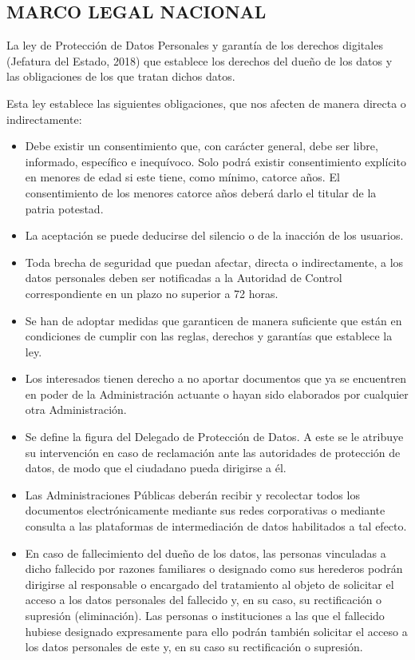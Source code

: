 \documentclass[11pt,a4paper,spanish]{article}
\begin{document}
\subsection{MARCO LEGAL NACIONAL}
La ley de Protección de Datos Personales y garantía de los derechos digitales (Jefatura del Estado, 2018) que establece los derechos del dueño de los datos y las obligaciones de los que tratan dichos datos.

Esta ley establece las siguientes obligaciones, que nos afecten de manera directa o indirectamente:

\begin{itemize}
\item Debe existir un consentimiento que, con carácter general, debe ser libre, informado, específico e inequívoco. Solo podrá existir consentimiento explícito en menores de edad si este tiene, como mínimo, catorce años. El consentimiento de los menores catorce años deberá darlo el titular de la patria potestad.
\item La aceptación se puede deducirse del silencio o de la inacción de los usuarios.
\item Toda brecha de seguridad que puedan afectar, directa o indirectamente, a los datos personales deben ser notificadas a la Autoridad de Control correspondiente en un plazo no superior a 72 horas.
\item Se han de adoptar medidas que garanticen de manera suficiente que están en condiciones de cumplir con las reglas, derechos y garantías que establece la ley.
\item Los interesados tienen derecho a no aportar documentos que ya se encuentren en poder de la Administración actuante o hayan sido elaborados por cualquier otra Administración.
\item Se define la figura del Delegado de Protección de Datos. A este se le atribuye su intervención en caso de reclamación ante las autoridades de protección de datos, de modo que el ciudadano pueda dirigirse a él.
\item Las Administraciones Públicas deberán recibir y recolectar todos los documentos electrónicamente mediante sus redes corporativas o mediante consulta a las plataformas de intermediación de datos habilitados a tal efecto.
\item En caso de fallecimiento del dueño de los datos, las personas vinculadas a dicho fallecido por razones familiares o designado como sus herederos podrán dirigirse al responsable o encargado del tratamiento al objeto de solicitar el acceso a los datos personales del fallecido y, en su caso, su rectificación o supresión (eliminación). Las personas o instituciones a las que el fallecido hubiese designado expresamente para ello podrán también solicitar el acceso a los datos personales de este y, en su caso su rectificación o supresión.
\end{itemize} 
\end{document}
